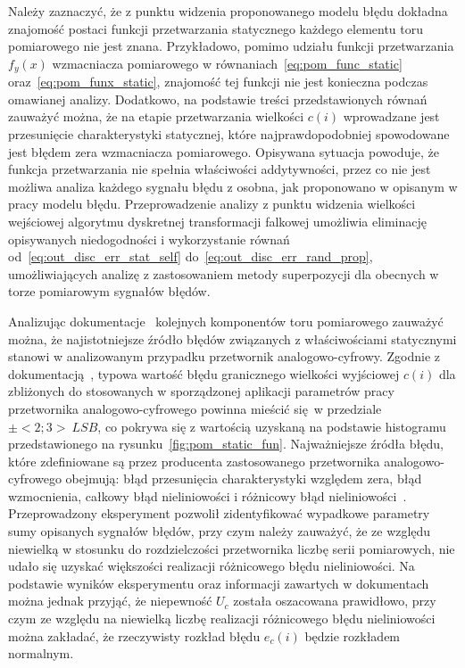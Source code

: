 Należy zaznaczyć, że z punktu widzenia proponowanego modelu błędu dokładna znajomość postaci funkcji przetwarzania statycznego każdego elementu toru pomiarowego nie jest znana. Przykładowo, pomimo udziału funkcji przetwarzania $f_{y}(x)$ wzmacniacza pomiarowego w równaniach~\eqref{eq:pom_func_static} oraz~\eqref{eq:pom_funx_static}, znajomość tej funkcji nie jest konieczna podczas omawianej analizy. Dodatkowo, na podstawie treści przedstawionych równań zauważyć można, że na etapie przetwarzania wielkości $c(i)$ wprowadzane jest przesunięcie charakterystyki statycznej, które najprawdopodobniej spowodowane jest błędem zera wzmacniacza pomiarowego. Opisywana sytuacja powoduje, że funkcja przetwarzania nie spełnia właściwości addytywności, przez co nie jest możliwa analiza każdego sygnału błędu z osobna, jak proponowano w opisanym w pracy modelu błędu. Przeprowadzenie analizy z punktu widzenia wielkości wejściowej algorytmu dyskretnej transformacji falkowej umożliwia eliminację opisywanych niedogodności i wykorzystanie równań od~\eqref{eq:out_disc_err_stat_self} do~\eqref{eq:out_disc_err_rand_prop}, umożliwiających analizę z zastosowaniem metody superpozycji dla obecnych w torze pomiarowym sygnałów błędów.

Analizując dokumentacje~\cite{microchip_manual, stm_manual, diodes_manual, stm_f411} kolejnych komponentów toru pomiarowego zauważyć można, że najistotniejsze źródło błędów związanych z właściwościami statycznymi stanowi w analizowanym przypadku przetwornik analogowo-cyfrowy. Zgodnie z dokumentacją~\cite{stm_f411}, typowa wartość błędu granicznego wielkości wyjściowej $c(i)$ dla zbliżonych do stosowanych w sporządzonej aplikacji parametrów pracy przetwornika analogowo-cyfrowego powinna mieścić się w przedziale $\pm<2; 3>~\unit{LSB}$, co pokrywa się z wartością uzyskaną na podstawie histogramu przedstawionego na rysunku~\ref{fig:pom_static_fun}. Najważniejsze źródła błędu, które zdefiniowane są przez producenta zastosowanego przetwornika analogowo-cyfrowego obejmują: błąd przesunięcia charakterystyki względem zera, błąd wzmocnienia, całkowy błąd nieliniowości i różnicowy błąd nieliniowości~\cite{stm_adc}. Przeprowadzony eksperyment pozwolił zidentyfikować wypadkowe parametry sumy opisanych sygnałów błędów, przy czym należy zauważyć, że ze względu niewielką w stosunku do rozdzielczości przetwornika liczbę serii pomiarowych, nie udało się uzyskać większości realizacji różnicowego błędu nieliniowości. Na podstawie wyników eksperymentu oraz informacji zawartych w dokumentach~\cite{stm_f411, stm_adc} można jednak przyjąć, że niepewność $U_{c}$ została oszacowana prawidłowo, przy czym ze względu na niewielką liczbę realizacji różnicowego błędu nieliniowości można zakładać, że rzeczywisty rozkład błędu $e_{c}(i)$ będzie rozkładem normalnym.


